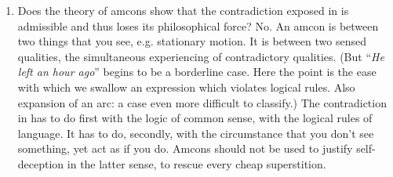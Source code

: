\begin{enumerate}[label=\textbf{\Alph*.}, wide, nosep, itemsep=1em]
Contrary to what the question of how it is that we are now talking suggests, we do not \enquote{see} language. (That is, we do not experience an objective relation between words and things.) The language we \enquote{see} is a shell whose \enquote{transcendental reference} is provided by self-deception. 

\item Does the theory of amcons show that the contradiction exposed in  is admissible and thus loses its philosophical force? No. An amcon is between two things that you see, e.g. stationary motion. It is between two sensed qualities, the simultaneous experiencing of contradictory qualities. (But \enquote{\emph{He left an hour ago}} begins to be a borderline case. Here the point is the ease with which we swallow an expression which violates logical rules. Also expansion of an arc: a case even more difficult to classify.) The contradiction in  has to do first with the logic of common sense, with the logical rules of language. It has to do, secondly, with the circumstance that you don't see something, yet act as if you do. Amcons should not be used to justify self-deception in the latter sense, to rescue every cheap superstition. \end{enumerate}
